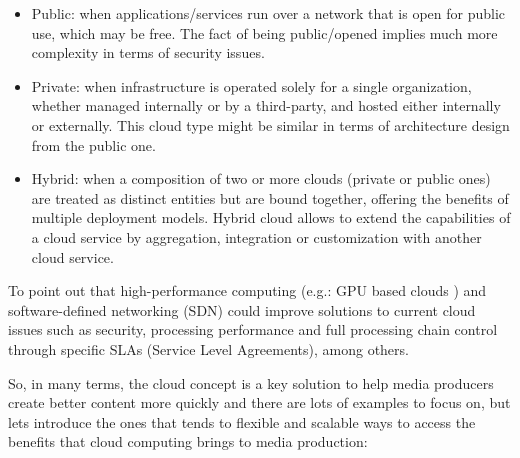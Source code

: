 \begin{itemize}
\item Public: when applications/services run over a network that is open for public use, which may be free. The fact of being public/opened implies much more complexity in terms of security issues.
\item Private: when infrastructure is operated solely for a single organization, whether managed internally or by a third-party, and hosted either internally or externally. This cloud type might be similar in terms of architecture design from the public one.
\item Hybrid: when a composition of two or more clouds (private or public ones) are treated as distinct entities but are bound together, offering the benefits of multiple deployment models. Hybrid cloud allows to extend the capabilities of a cloud service by aggregation, integration or customization with another cloud service.
\end{itemize}

To point out that high-performance computing (e.g.: GPU based clouds \cite{gpu}) and software-defined networking (SDN) could improve solutions to current cloud issues such as security, processing performance and full processing chain control through specific SLAs (Service Level Agreements), among others.

So, in many terms, the cloud concept is a key solution to help media producers create better content more quickly and there are lots of examples to focus on, but lets introduce the ones that tends to flexible and scalable ways to access the benefits that cloud computing brings to media production:

